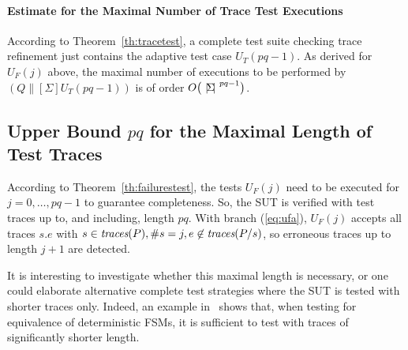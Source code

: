 \paragraph{Estimate for the Maximal Number of Trace Test Executions}
According to Theorem~\ref{th:tracetest}, a complete test suite checking trace
refinement just contains the adaptive test case $U_T(pq-1)$. As derived for
$U_F(j)$ above, the maximal number of executions to be performed by
$(Q\parallel[\Sigma] U_T(pq-1))$ is of order
$O\big({~|\! \Sigma\!|~}^{pq-1}\big)$.

\subsection{Upper Bound $pq$ for the Maximal Length of Test Traces}
\label{section:complexity:length}

According to Theorem~\ref{th:failurestest}, the tests $U_F(j)$ need to be
executed for $j = 0,\dots,pq-1$ to guarantee completeness. So, the SUT is
verified with test traces up to, and including, length $pq$. With branch
(\ref{eq:ufa}), $U_F(j)$ accepts all traces $s.e$ with $s\in\text{\it traces}(P), \#s
= j, e\not\in\text{\it traces}(P/s)$, so erroneous traces up to length $j+1$ are detected.

It is interesting to investigate whether this maximal length is necessary, or
one could elaborate alternative complete test strategies where the
SUT is tested with shorter traces only. Indeed, an example
in~\cite[Exercise~5]{PeleskaHuangLectureNotesMBT} shows that, when testing
for equivalence of deterministic FSMs, it is sufficient to test with
traces of significantly shorter length.

